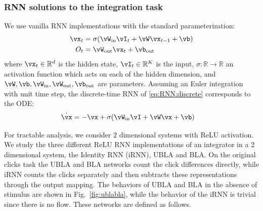 \documentclass{article} %
\newcounter{ct}
\newcommand{\win}{\vW_{\text{in}}}
\newcommand{\wout}{\vW_{\text{out}}}
\newcommand{\bout}{\vb_{\text{out}}}
\newcommand{\reals}{\mathbb{R}}
\theoremstyle{definition}
\theoremstyle{remark}
\begin{document}
\subsubsection{RNN solutions to the integration task}\label{sec:rnn:integration}
We use vanilla RNN implementations with the standard parameterization:
\begin{equation}
  \begin{aligned}
	\vx_t &= \sigma(\win \vI_t + \vW \vx_{t-1} + \vb) \label{eq:RNN:discrete}\\
	O_t &= \wout \vx_t + \bout
  \end{aligned}
\end{equation}
where $\vx_t \in \reals^d$ is the hidden state, $\vI_t \in \reals^K$ is the input,
$\sigma: \reals \to \reals$ an activation function which acts on each of the hidden dimension, and
$\vW, \vb, \win, \wout, \bout$ are parameters.
Assuming an Euler integration with unit time step, the discrete-time RNN of \eqref{eq:RNN:discrete} corresponds to the ODE:
\begin{align}
    \dot{\vx} &= -\vx + \sigma(\win \vI + \vW \vx + \vb) \label{eq:RNN:continuous}
\end{align}

For tractable analysis, we consider $2$ dimensional systems with ReLU activation. %
We study the three different ReLU RNN implementations of an integrator in a 2 dimensional system, the Identity RNN (iRNN), UBLA and BLA.
On the original clicks task the UBLA and BLA networks count the click differences directly, while iRNN counts the clicks separately and then subtracts these representations through the output mapping.
The behaviors of UBLA and BLA in the absence of stimulus are shown in Fig.~\ref{fig:ublabla}, while the behavior of the iRNN is trivial since there is no flow. These networks are defined as follows.
\end{document}
